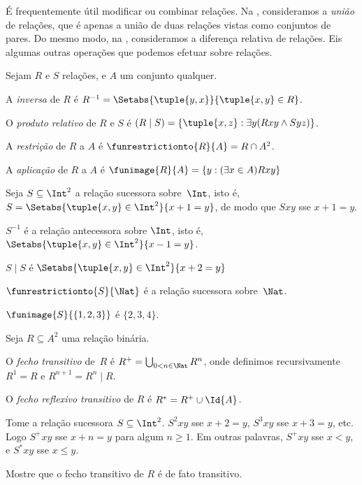 \documentclass[../../../include/open-logic-section]{subfiles}
\begin{document}

É frequentemente útil modificar ou combinar relações. Na
, consideramos a \emph{união}
de relações, que é apenas a união de duas relações vistas como
conjuntos de pares. Do mesmo modo, na ,
consideramos a diferença relativa de relações. Eis algumas
outras operações que podemos efetuar sobre relações.

\begin{defn}
Sejam $R$ e $S$ relações, e $A$ um conjunto qualquer.

A \emph{inversa} de $R$ é $R^{-1} = \Setabs{\tuple{y, x}}{\tuple{x,
    y} \in R}$.

O \emph{produto relativo} de $R$ e $S$ é $(R \mid S) =
\{\tuple{x, z} : \exists y(Rxy \land Syz)\}$.

A \emph{restrição} de $R$ a $A$ é $\funrestrictionto{R}{A}= R
\cap A^2$.

A \emph{aplicação} de $R$ a $A$ é $\funimage{R}{A} = \{y :
(\exists x \in A)Rxy\}$
\end{defn}

\begin{ex}
Seja $S \subseteq \Int^2$ a relação sucessora sobre~$\Int$, isto é,
$S = \Setabs{\tuple{x, y} \in \Int^2}{x + 1 = y}$, de modo que $Sxy$ sse $x + 1 = y$.

$S^{-1}$ é a relação antecessora sobre $\Int$, isto é,
$\Setabs{\tuple{x,y}\in\Int^2}{x -1 =y}$.

$S\mid S$ é
$ \Setabs{\tuple{x,y}\in\Int^2}{x + 2 =y}$

$\funrestrictionto{S}{\Nat}$ é a relação sucessora sobre~$\Nat$.

$\funimage{S}{\{1,2,3\}}$ é $\{2, 3, 4\}$.
\end{ex}

\begin{defn}Seja $R \subseteq A^2$ uma relação binária.

O \emph{fecho transitivo} de~$R$ é $R^+ = \bigcup_{0 < n \in
\Nat} R^n$, onde definimos recursivamente $R^1 = R$ e $R^{n+1} = R^n
\mid R$.

O \emph{fecho reflexivo transitivo} de $R$ é $R^* = R^+ \cup
\Id{A}$.
\end{defn}

\begin{ex}
Tome a relação sucessora $S \subseteq \Int^2$. $S^2xy$ sse $x + 2 =
y$, $S^3xy$ sse $x + 3 = y$, etc. Logo $S^+xy$ sse $x + n = y$ para algum
$n \geq 1$. Em outras palavras, $S^+xy$ sse $x < y$, e $S^*xy$ sse $x \le
y$.
\end{ex}

\begin{prob}
Mostre que o fecho transitivo de $R$ é de fato transitivo.
\end{prob}
\end{document}
